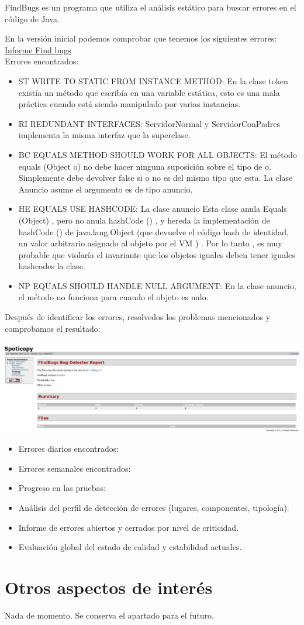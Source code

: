 \documentclass[12pt, a4paper, titlepage]{article}
\begin{document}
	FindBugs es un programa que utiliza el análisis estático para buscar errores en el código de Java.
	
	En la versión inicial podemos comprobar que tenemos los siguientes errores:
	\href{Informes/SiteTestInicial/findbugs.html}{Informe Find bugs} \\

	Errores encontrados:
	\begin{itemize}
		\item 	ST WRITE TO STATIC FROM INSTANCE METHOD: En la clase token existía un método que escribía en una variable estática, esto es una mala práctica cuando está siendo manipulado por varias instancias.
		\item 	RI REDUNDANT INTERFACES: ServidorNormal y ServidorConPadres implementa la misma interfaz que la superclase.
		\item BC EQUALS METHOD SHOULD WORK FOR ALL OBJECTS: El método equals (Object o) no debe hacer ninguna suposición sobre el tipo de o. Simplemente debe devolver false si o no es del mismo tipo que esta. La clase Anuncio asume el argumento es de tipo anuncio.
		\item HE EQUALS USE HASHCODE: La clase anuncio Esta clase anula Equals (Object) , pero no anula hashCode () , y hereda la implementación de hashCode () de java.lang.Object (que devuelve el código hash de identidad, un valor arbitrario asignado al objeto por el VM ) . Por lo tanto , es muy probable que violaría el invariante que los objetos iguales deben tener iguales hashcodes la clase.
		\item NP EQUALS SHOULD HANDLE NULL ARGUMENT: En la clase anuncio, el método no funciona para cuando el objeto es nulo.	
	\end{itemize}
	Después de identificar los errores, resolvedos los problemas mencionados y comprobamos el resultado:\\
	\\
	\includegraphics[width=15cm]{Imagenes/FindsBugs2.png} \\
	\begin{itemize}
		\item Errores diarios encontrados:
		\item Errores semanales encontrados:
		\item Progreso en las pruebas:
		\item Análisis del perfil de detección de errores (lugares, componentes, tipología).
		\item Informe de errores abiertos y cerrados por nivel de criticidad.
		\item Evaluación global del estado de calidad y estabilidad actuales.
	\end{itemize}
	
	\section{Otros aspectos de interés}
	
	Nada de momento. Se conserva el apartado para el futuro.
	
\end{document}
